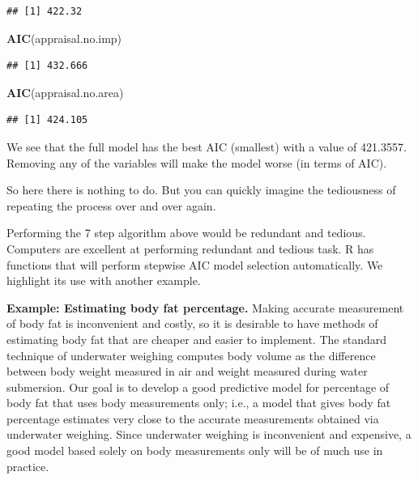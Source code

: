 \documentclass[
]{book}
\newenvironment{Shaded}{\begin{snugshade}}{\end{snugshade}}
\newcommand{\FunctionTok}[1]{\textcolor[rgb]{0.13,0.29,0.53}{\textbf{#1}}}
\newcommand{\NormalTok}[1]{#1}
\begin{document}
\begin{verbatim}
## [1] 422.32
\end{verbatim}

\begin{Shaded}
\begin{Highlighting}[]
\FunctionTok{AIC}\NormalTok{(appraisal.no.imp)}
\end{Highlighting}
\end{Shaded}

\begin{verbatim}
## [1] 432.666
\end{verbatim}

\begin{Shaded}
\begin{Highlighting}[]
\FunctionTok{AIC}\NormalTok{(appraisal.no.area)}
\end{Highlighting}
\end{Shaded}

\begin{verbatim}
## [1] 424.105
\end{verbatim}

We see that the full model has the best AIC (smallest) with a value of 421.3557. Removing any of the variables will make the model worse (in terms of AIC).

So here there is nothing to do. But you can quickly imagine the tediousness of repeating the process over and over again.

Performing the 7 step algorithm above would be redundant and tedious. Computers are excellent at performing redundant and tedious task. R has functions that will perform stepwise AIC model selection automatically. We highlight its use with another example.

\textbf{Example: Estimating body fat percentage.} Making accurate measurement of body fat is inconvenient and costly, so it is desirable to have methods of estimating body fat that are cheaper and easier to implement. The standard technique of underwater weighing computes body volume as the difference between body weight measured in air and weight measured during water submersion. Our goal is to develop a good predictive model for percentage of body fat that uses body measurements only; i.e., a model that gives body fat percentage estimates very close to the accurate measurements obtained via underwater weighing. Since underwater weighing is inconvenient and expensive, a good model based solely on body measurements only will be of much use in practice.
\end{document}
